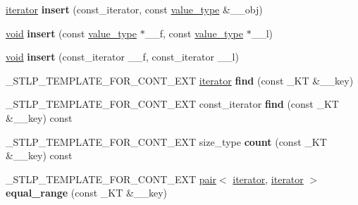 \begin{DoxyCompactItemize}
\item 
\mbox{\label{classunordered__multimap_a38b2bf667b662b5c1f12b8cff9fb605f}} 
\hyperlink{structiterator}{iterator} {\bfseries insert} (const\+\_\+iterator, const \hyperlink{structpair}{value\+\_\+type} \&\+\_\+\+\_\+obj)
\item 
\mbox{\label{classunordered__multimap_a229b2f61c40690e3ee12253eb4c29cc4}} 
\hyperlink{interfacevoid}{void} {\bfseries insert} (const \hyperlink{structpair}{value\+\_\+type} $\ast$\+\_\+\+\_\+f, const \hyperlink{structpair}{value\+\_\+type} $\ast$\+\_\+\+\_\+l)
\item 
\mbox{\label{classunordered__multimap_a4ea28987d4bdb2cc6996ee6b8001920d}} 
\hyperlink{interfacevoid}{void} {\bfseries insert} (const\+\_\+iterator \+\_\+\+\_\+f, const\+\_\+iterator \+\_\+\+\_\+l)
\item 
\mbox{\label{classunordered__multimap_a72d4b6924986d4629dcd86c6c5b23f82}} 
\+\_\+\+S\+T\+L\+P\+\_\+\+T\+E\+M\+P\+L\+A\+T\+E\+\_\+\+F\+O\+R\+\_\+\+C\+O\+N\+T\+\_\+\+E\+XT \hyperlink{structiterator}{iterator} {\bfseries find} (const \+\_\+\+KT \&\+\_\+\+\_\+key)
\item 
\mbox{\label{classunordered__multimap_a1cb18dbe66d066305ab44e5c0f522d27}} 
\+\_\+\+S\+T\+L\+P\+\_\+\+T\+E\+M\+P\+L\+A\+T\+E\+\_\+\+F\+O\+R\+\_\+\+C\+O\+N\+T\+\_\+\+E\+XT const\+\_\+iterator {\bfseries find} (const \+\_\+\+KT \&\+\_\+\+\_\+key) const
\item 
\mbox{\label{classunordered__multimap_aebc6dcc1e3862046b5d8460092370de3}} 
\+\_\+\+S\+T\+L\+P\+\_\+\+T\+E\+M\+P\+L\+A\+T\+E\+\_\+\+F\+O\+R\+\_\+\+C\+O\+N\+T\+\_\+\+E\+XT size\+\_\+type {\bfseries count} (const \+\_\+\+KT \&\+\_\+\+\_\+key) const
\item 
\mbox{\label{classunordered__multimap_a4e24aa7fbf731b54150ea4f0ff660bfc}} 
\+\_\+\+S\+T\+L\+P\+\_\+\+T\+E\+M\+P\+L\+A\+T\+E\+\_\+\+F\+O\+R\+\_\+\+C\+O\+N\+T\+\_\+\+E\+XT \hyperlink{structpair}{pair}$<$ \hyperlink{structiterator}{iterator}, \hyperlink{structiterator}{iterator} $>$ {\bfseries equal\+\_\+range} (const \+\_\+\+KT \&\+\_\+\+\_\+key)

\end{DoxyCompactItemize}

